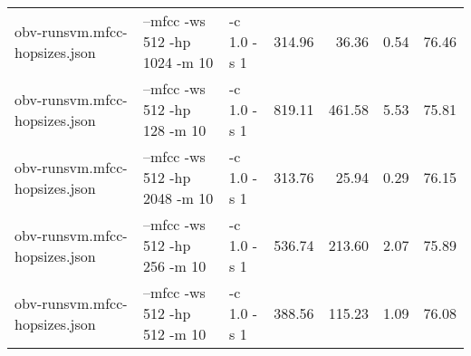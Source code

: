 \documentclass[11pt,a4paper]{article}
\begin{document}
\begin{tabular}{lllrrrr}
 obv-runsvm.mfcc-hopsizes.json  &  --mfcc -ws 512  -hp 1024   -m 10  &  -c 1.0 -s 1  &   314.96  &   36.36  &  0.54  &  76.46  \\
 obv-runsvm.mfcc-hopsizes.json  &  --mfcc -ws 512  -hp 128    -m 10  &  -c 1.0 -s 1  &   819.11  &  461.58  &  5.53  &  75.81  \\
 obv-runsvm.mfcc-hopsizes.json  &  --mfcc -ws 512  -hp 2048   -m 10  &  -c 1.0 -s 1  &   313.76  &   25.94  &  0.29  &  76.15  \\
 obv-runsvm.mfcc-hopsizes.json  &  --mfcc -ws 512  -hp 256    -m 10  &  -c 1.0 -s 1  &   536.74  &  213.60  &  2.07  &  75.89  \\
 obv-runsvm.mfcc-hopsizes.json  &  --mfcc -ws 512  -hp 512    -m 10  &  -c 1.0 -s 1  &   388.56  &  115.23  &  1.09  &  76.08  \\
\end{tabular}
\end{document}
